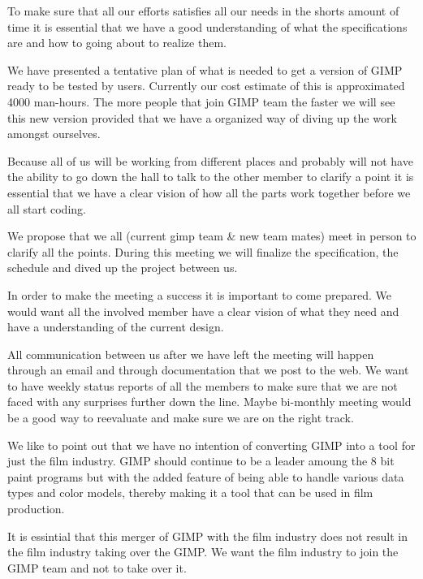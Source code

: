 To make sure that all our efforts satisfies all our needs in the shorts amount of time it is essential that we have a good understanding of what the specifications are and how to going about to realize them. 

We have presented a tentative plan of what is needed to get a version of GIMP ready to be tested by users. Currently our cost estimate of this is approximated 4000 man-hours. The more people that join GIMP team the faster we will see this new version provided that we have a organized way of diving up the work amongst ourselves.

Because all of us will be working from different places and probably will not have the ability to go down the hall to talk to the other member to clarify a point it is essential that we have a clear vision of how all the parts work together before we all start coding.

We propose that we all (current gimp team & new team mates) meet in person to clarify all the points. During this meeting we will finalize the specification, the schedule and dived up the project between us.

In order to make the meeting a success it is important to come prepared. We would want all the involved member have a clear vision of what they need and have a understanding of the current design. 

All communication between us after we have left the meeting will happen through an email and through documentation that we post to the web. We want to have weekly status reports of all the members to make sure that we are not faced with any surprises further down the line. Maybe bi-monthly meeting would be a good way to reevaluate and make sure we are on the right track.

We like to point out that we have no intention of converting GIMP into a tool for just the film industry. GIMP should continue to be a leader amoung the 8 bit paint programs but with the added feature of being able to handle various data types and color models, thereby making it a tool that can be used in film production.



 

It is essintial that this merger of GIMP with the film industry does not result in the film industry taking over the GIMP. We want the film industry to join the GIMP team and not to take over it.
 
 




